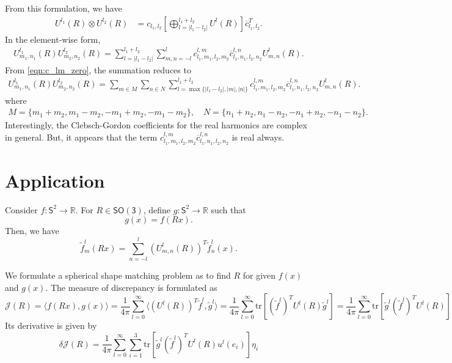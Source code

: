 \documentclass[onecolumn,11pt]{IEEEtran}
\newcommand{\bracket}[1]{\ensuremath{\left[ #1 \right]}}
\newcommand{\pair}[1]{\ensuremath{\langle #1 \rangle}}
\newcommand{\trs}[1]{\mathrm{tr}\ensuremath{[#1]}}
\newcommand{\SO}{\ensuremath{\mathsf{SO(3)}}}
\renewcommand{\Re}{\ensuremath{\mathbb{R}}}
\newcommand{\Sph}{\ensuremath{\mathsf{S}}}
\begin{document}
From this formulation, we have
\begin{align}
    U^{l_1}(R) \otimes U^{l_2}(R) & = c_{l_1,l_2} \bracket{ \bigoplus_{l=|l_1-l_2|}^{l_1+l_2} U^l(R) } \overline{c}_{l_1,l_2}^T.
\end{align}
In the element-wise form,
\begin{align}
    U^{l_1}_{m_1,n_1} (R) U^{l_2}_{m_2,n_2}(R) = \sum_{l=|l_1-l_2|}^{l_1+l_2} \sum_{m,n=-l}^l c^{l,m}_{l_1,m_1,l_2,m_2} \overline{c}^{l,n}_{l_1,n_1,l_2,n_2} U^{l}_{m,n}(R).
\end{align}
From \eqref{eqn:c_lm_zero}, the summation reduces to
\begin{align}
    U^{l_1}_{m_1,n_1} (R) U^{l_2}_{m_2,n_2}(R) =  \sum_{m\in M} \sum_{n\in N} \sum_{l=\max\{|l_1-l_2|,|m|,|n|\}}^{l_1+l_2} c^{l,m}_{l_1,m_1,l_2,m_2} \overline{c}^{l,n}_{l_1,n_1,l_2,n_2} U^{l}_{m,n}(R).
\end{align}
where
\begin{align}
    M=\{m_1+m_2,m_1-m_2,-m_1+m_2,-m_1-m_2\},\quad N=\{n_1+n_2,n_1-n_2,-n_1+n_2,-n_1-n_2\}.
\end{align}
Interestingly, the Clebsch-Gordon coefficients for the real harmonics are complex in general. 
But, it appears that the term $ c^{l,m}_{l_1,m_1,l_2,m_2} \overline{c}^{l,n}_{l_1,n_1,l_2,n_2}$ is real always.

\section{Application}

Consider $f:\Sph^2\rightarrow \Re$. 
For $R\in\SO$, define $g:\Sph^2\rightarrow \Re$ such that
\[
    g(x) = f(R x).
\]
Then, we have
\[
    \tilde f^l_m (R x) = \sum_{n=-l}^l (U^l_{m,n}(R))^T \tilde f^l_n(x).
\]

We formulate a spherical shape matching problem as to find $R$ for given $f(x)$ and $g(x)$. 
The measure of discrepancy is formulated as
\[
    \mathcal{J}(R) = \pair{ f(R x), g(x)} =  
    \frac{1}{4\pi} \sum_{l=0}^\infty \pair{ (U^l(R))^T\tilde f^l,  \tilde g^l}= \frac{1}{4\pi} \sum_{l=0}^\infty \trs{ (\tilde f^l)^T U^l(R) \tilde g^l} =  \frac{1}{4\pi} \sum_{l=0}^\infty \trs{\tilde g^l (\tilde f^l)^T U^l(R) } 
\]
Its derivative is given by
\[
    \delta \mathcal{J}(R) =  \frac{1}{4\pi} \sum_{l=0}^\infty \sum_{i=1}^3\trs{\tilde g^l (\tilde f^l)^T U^l(R) u^l(e_i) } \eta_i 
\]



\end{document}

